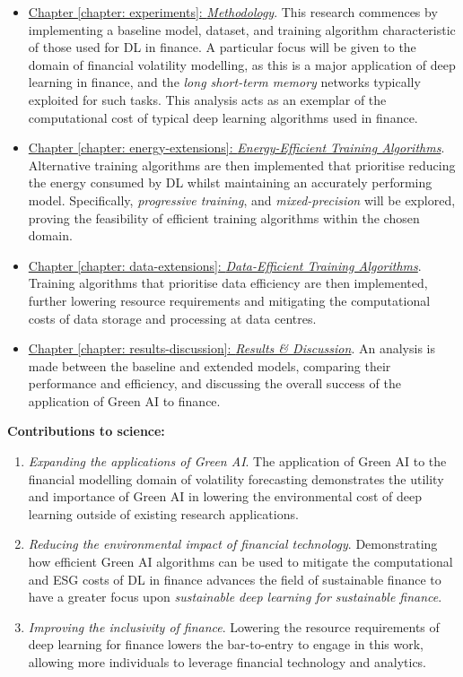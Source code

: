 \documentclass[a4paper, 11pt]{report}
\begin{document}
    \begin{itemize}
        \item \underline{Chapter \ref{chapter: experiments}: \emph{Methodology}}. This research commences by implementing a baseline model, dataset, and training algorithm characteristic of those used for DL in finance. A particular focus will be given to the domain of financial volatility modelling, as this is a major application of deep learning in finance, and the \emph{long short-term memory} networks typically exploited for such tasks. This analysis acts as an exemplar of the computational cost of typical deep learning algorithms used in finance.

        \item \underline{Chapter \ref{chapter: energy-extensions}: \emph{Energy-Efficient Training Algorithms}}. Alternative training algorithms are then implemented that prioritise reducing the energy consumed by DL whilst maintaining an accurately performing model. Specifically, \emph{progressive training}, and \emph{mixed-precision} will be explored, proving the feasibility of efficient training algorithms within the chosen domain.
        
        \item \underline{Chapter \ref{chapter: data-extensions}: \emph{Data-Efficient Training Algorithms}}. Training algorithms that prioritise data efficiency are then implemented, further lowering resource requirements and mitigating the computational costs of data storage and processing at data centres.
        
        \item \underline{Chapter \ref{chapter: results-discussion}: \emph{Results \& Discussion}}. An analysis is made between the baseline and extended models, comparing their performance and efficiency, and discussing the overall success of the application of Green AI to finance.
    \end{itemize}

    \textbf{Contributions to science:} 
    \begin{enumerate}
        \item \emph{Expanding the applications of Green AI}. The application of Green AI to the financial modelling domain of volatility forecasting demonstrates the utility and importance of Green AI in lowering the environmental cost of deep learning outside of existing research applications. 

        \item \emph{Reducing the environmental impact of financial technology}. Demonstrating how efficient Green AI algorithms can be used to mitigate the computational and ESG costs of DL in finance advances the field of sustainable finance to have a greater focus upon \emph{sustainable deep learning for sustainable finance}.

        \item \emph{Improving the inclusivity of finance}. Lowering the resource requirements of deep learning for finance lowers the bar-to-entry to engage in this work, allowing more individuals to leverage financial technology and analytics.
    \end{enumerate}
\end{document}
